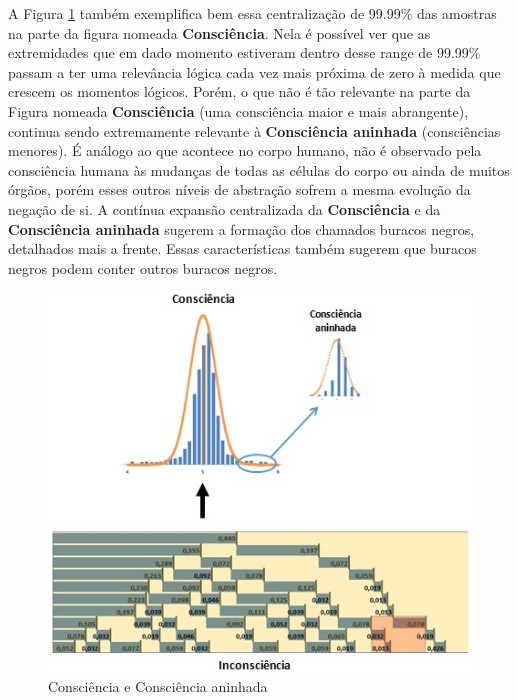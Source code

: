 A Figura \ref{fig:unconsciousness_consciousness_consciousness_nested} também exemplifica bem essa centralização de 99.99\% das amostras na parte da figura nomeada \textbf{Consciência}. Nela é possível ver que as extremidades que em dado momento estiveram dentro desse range de 99.99\% passam a ter uma relevância lógica cada vez mais próxima de zero à medida que crescem os momentos lógicos. Porém, o que não é tão relevante na parte da Figura nomeada \textbf{Consciência} (uma consciência maior e mais abrangente), continua sendo extremamente relevante à \textbf{Consciência aninhada} (consciências menores). É análogo ao que acontece no corpo humano, não é observado pela consciência humana às mudanças de todas as células do corpo ou ainda de muitos órgãos, porém esses outros níveis de abstração sofrem a mesma evolução da negação de si. A contínua expansão centralizada da \textbf{Consciência} e da \textbf{Consciência aninhada} sugerem a formação dos chamados buracos negros, detalhados mais a frente. Essas características também sugerem que buracos negros podem conter outros buracos negros.

\begin{figure}[H]
\caption{Consciência e Consciência aninhada}
\label{fig:unconsciousness_consciousness_consciousness_nested}
\centering
\includegraphics[scale=1]{sections/images/unconsciousness_consciousness_consciousness_nested.jpg}
\end{figure}

